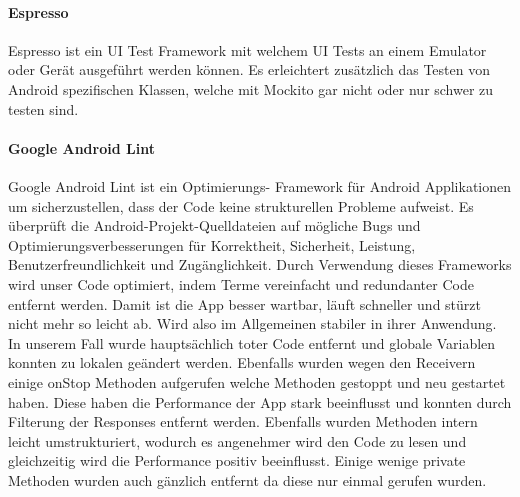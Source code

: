 	\paragraph{Espresso}
	Espresso ist ein UI Test Framework mit welchem UI Tests an einem Emulator oder Gerät ausgeführt werden können. Es erleichtert zusätzlich das Testen von Android spezifischen Klassen, welche mit Mockito gar nicht oder nur schwer zu testen sind.

	\paragraph{Google Android Lint}
	Google Android Lint ist ein Optimierungs- Framework für Android Applikationen um sicherzustellen, dass der Code keine strukturellen Probleme aufweist. Es überprüft die Android-Projekt-Quelldateien auf mögliche Bugs und Optimierungsverbesserungen für Korrektheit, Sicherheit, Leistung, Benutzerfreundlichkeit und Zugänglichkeit.
	Durch Verwendung dieses Frameworks wird unser Code optimiert, indem Terme vereinfacht und redundanter Code entfernt werden. Damit ist die App besser wartbar, läuft schneller und stürzt nicht mehr so leicht ab. Wird also im Allgemeinen stabiler in ihrer Anwendung.
	In unserem Fall wurde hauptsächlich toter Code entfernt und globale Variablen konnten zu lokalen geändert werden. Ebenfalls wurden wegen den Receivern einige onStop Methoden aufgerufen welche Methoden gestoppt und neu gestartet haben. Diese haben die Performance der App stark beeinflusst und konnten durch Filterung der Responses entfernt werden. Ebenfalls wurden Methoden intern leicht umstrukturiert, wodurch es angenehmer wird den Code zu lesen und gleichzeitig wird die Performance positiv beeinflusst. Einige wenige private Methoden wurden auch gänzlich entfernt da diese nur einmal gerufen wurden.






